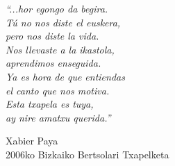 %

\vspace*{.30\textheight}
\begin{flushright}
\begin{minipage}{0.65\textwidth}
\begin{flushright}
\itshape
``...hor egongo da begira.\\

\vspace{1.5ex}
Tú no nos diste el euskera,\\
pero nos diste la vida.\\
Nos llevaste a la ikastola,\\
aprendimos enseguida.\\
Ya es hora de que entiendas\\
el canto que nos motiva.\\
Esta txapela es tuya,\\
ay nire amatxu querida.''

\bigskip

\normalfont
\small{Xabier Paya}\\
\scriptsize{2006ko Bizkaiko Bertsolari Txapelketa}
\end{flushright}
\end{minipage}
\end{flushright}
\clearpage